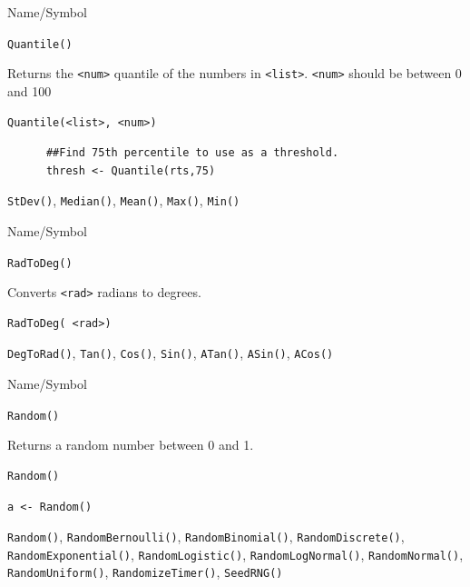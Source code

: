 \vfill
\newpage
{}
\vfill


\begin{desc}{Name/Symbol}
\item[Name/Symbol]	\verb+Quantile()+

\item[Description]	Returns the \verb+<num>+ quantile of
		the numbers in \verb+<list>+. \verb+<num>+ should be  between
        0 and 100

\item[Usage]		
\begin{verbatim}
Quantile(<list>, <num>)
\end{verbatim}

\item[Example]	
 \begin{verbatim}
      ##Find 75th percentile to use as a threshold.
      thresh <- Quantile(rts,75) 
 \end{verbatim}
\item[See Also]	\verb+StDev()+, \verb+Median()+, \verb+Mean()+, \verb+Max()+, \verb+Min()+
\end{desc}

\vfill
\newpage
{}
\vfill


\begin{desc}{Name/Symbol}
\item[Name/Symbol] 	\verb+RadToDeg()+ 

\item[Description] 	Converts \verb+<rad>+ radians to degrees.

\item[Usage]		
\begin{verbatim}
RadToDeg( <rad>)			 
\end{verbatim}

\item[Example]	

\item[See Also]     	\verb+DegToRad()+, \verb+Tan()+, \verb+Cos()+, \verb+Sin()+, \verb+ATan()+, \verb+ASin()+, \verb+ACos()+
\end{desc}


\begin{desc}{Name/Symbol}
\item[Name/Symbol]	\verb+Random()+

\item[Description]	Returns a random number between 0 and 1.

\item[Usage]
\begin{verbatim}
Random()
\end{verbatim}

\item[Example]
\begin{verbatim}
a <- Random()
\end{verbatim}

\item[See Also]		\verb+Random()+, \verb+RandomBernoulli()+, \verb+RandomBinomial()+, \verb+RandomDiscrete()+, \verb+RandomExponential()+, \verb+RandomLogistic()+, \verb+RandomLogNormal()+, \verb+RandomNormal()+, \verb+RandomUniform()+, \verb+RandomizeTimer()+, \verb+SeedRNG()+
\end{desc}

